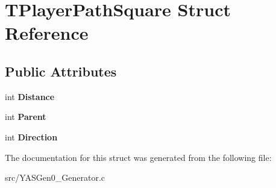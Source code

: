 \hypertarget{struct_t_player_path_square}{}\section{T\+Player\+Path\+Square Struct Reference}
\label{struct_t_player_path_square}
\subsection*{Public Attributes}
\begin{DoxyCompactItemize}
\item 
\mbox{\label{struct_t_player_path_square_a6a3158e8aaa515b008d831ffb298f8a6}} 
int {\bfseries Distance}
\item 
\mbox{\label{struct_t_player_path_square_a9171fcd1225bfbc55d2e8faf98058c9b}} 
int {\bfseries Parent}
\item 
\mbox{\label{struct_t_player_path_square_a3ecaca6b55948d18dfec15c5ad8c42e2}} 
int {\bfseries Direction}
\end{DoxyCompactItemize}


The documentation for this struct was generated from the following file\+:\begin{DoxyCompactItemize}
\item 
src/Y\+A\+S\+Gen0\+\_\+\+Generator.\+c\end{DoxyCompactItemize}
